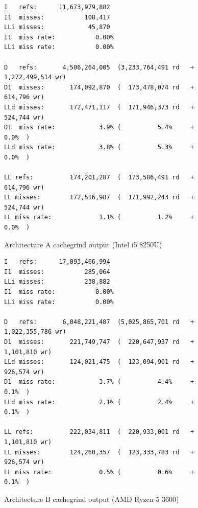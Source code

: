 \documentclass{article}
\begin{document}
\begin{figure}[!h]
\centering
\begin{BVerbatim}
I   refs:      11,673,979,882
I1  misses:           108,417
LLi misses:            45,870
I1  miss rate:           0.00%
LLi miss rate:           0.00%

D   refs:       4,506,264,005  (3,233,764,491 rd   + 1,272,499,514 wr)
D1  misses:       174,092,870  (  173,478,074 rd   +       614,796 wr)
LLd misses:       172,471,117  (  171,946,373 rd   +       524,744 wr)
D1  miss rate:            3.9% (          5.4%     +           0.0%  )
LLd miss rate:            3.8% (          5.3%     +           0.0%  )

LL refs:          174,201,287  (  173,586,491 rd   +       614,796 wr)
LL misses:        172,516,987  (  171,992,243 rd   +       524,744 wr)
LL miss rate:             1.1% (          1.2%     +           0.0%  )
\end{BVerbatim}
\caption{Architecture A cachegrind output (Intel i5 8250U)}
\label{arch_a_cachegrind_laptop}
\end{figure}

\begin{figure}[!h]
\centering
\begin{BVerbatim}
I   refs:      17,093,466,994
I1  misses:           285,064
LLi misses:           238,882
I1  miss rate:           0.00%
LLi miss rate:           0.00%

D   refs:       6,048,221,487  (5,025,865,701 rd   + 1,022,355,786 wr)
D1  misses:       221,749,747  (  220,647,937 rd   +     1,101,810 wr)
LLd misses:       124,021,475  (  123,094,901 rd   +       926,574 wr)
D1  miss rate:            3.7% (          4.4%     +           0.1%  )
LLd miss rate:            2.1% (          2.4%     +           0.1%  )

LL refs:          222,034,811  (  220,933,001 rd   +     1,101,810 wr)
LL misses:        124,260,357  (  123,333,783 rd   +       926,574 wr)
LL miss rate:             0.5% (          0.6%     +           0.1%  )
\end{BVerbatim}
\caption{Architecture B cachegrind output (AMD Ryzen 5 3600)}
\label{arch_b_cachegrind_pc}
\end{figure}
\end{document}
